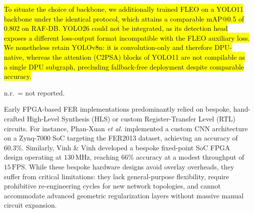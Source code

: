 \documentclass[algorithms,article,submit,moreauthors]{Definitions/mdpi}
\newcommand{\rev}[1]{\hl{#1}}
\begin{document}
\rev{To situate the choice of backbone, we additionally trained FLEO on a YOLO11 backbone under the identical protocol, which attains a comparable mAP@0.5 of $0.802$ on RAF-DB. YOLO26 could not be integrated, as its detection head exposes a different loss-output format incompatible with the FLEO auxiliary loss. We nonetheless retain YOLOv8n: it is convolution-only and therefore DPU-native, whereas the attention (C2PSA) blocks of YOLO11 are not compilable as a single DPU subgraph, precluding fallback-free deployment despite comparable accuracy.}

\begin{table}[h!]
\centering
\caption{Comparative Study with prior FPGA-based facial expression recognition systems.}
\label{tab:comparative}
\begin{tablenotes}[flushleft]\footnotesize
\item n.r.\ = not reported.
\end{tablenotes}
\end{table}

Early FPGA-based FER implementations predominantly relied on bespoke, hand-crafted High-Level Synthesis (HLS) or custom Register-Transfer Level (RTL) circuits. For instance, Phan-Xuan \textit{et al.}\citep{bib12} implemented a custom CNN architecture on a Zynq-7000 SoC targeting the FER2013 dataset, achieving an accuracy of $60.3\%$. Similarly, Vinh \& Vinh \citep{bib13} developed a bespoke fixed-point SoC FPGA design operating at $130\,\text{MHz}$, reaching $66\%$ accuracy at a modest throughput of $15\,\text{FPS}$. While these bespoke hardware designs avoid overlay overheads, they suffer from critical limitations: they lack general-purpose flexibility, require prohibitive re-engineering cycles for new network topologies, and cannot accommodate advanced geometric regularization layers without massive manual circuit expansion.
\end{document}
